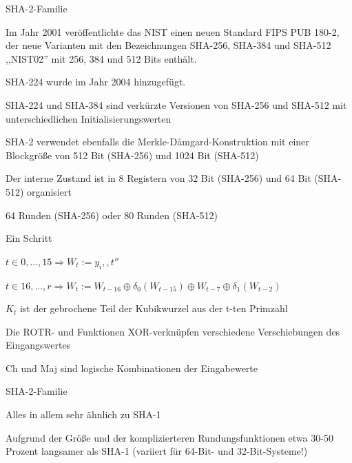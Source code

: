 \documentclass[a4paper]{article}
\begin{document}
\begin{multicols}{3}
\begin{itemize*}
            \item SHA-2-Familie
            \begin{itemize*}
                  \item Im Jahr 2001 veröffentlichte das NIST einen neuen Standard FIPS PUB 180-2, der neue Varianten mit den Bezeichnungen SHA-256, SHA-384 und SHA-512 ,,NIST02'' mit 256, 384 und 512 Bits enthält.
                  \begin{itemize*} \item SHA-224 wurde im Jahr 2004 hinzugefügt. \end{itemize*}
                  \item SHA-224 und SHA-384 sind verkürzte Versionen von SHA-256 und SHA-512 mit unterschiedlichen Initialisierungswerten
                  \item SHA-2 verwendet ebenfalls die Merkle-Dåmgard-Konstruktion mit einer Blockgröße von 512 Bit (SHA-256) und 1024 Bit (SHA-512)
                  \item Der interne Zustand ist in 8 Registern von 32 Bit (SHA-256) und 64 Bit (SHA-512) organisiert
                  \item 64 Runden (SHA-256) oder 80 Runden (SHA-512)
            \end{itemize*}
            \item Ein Schritt
            \begin{itemize*}
                  \item $t\in{0, ..., 15}\Rightarrow W_t:=y_i,,t''$
                  \item $t\in{16, ..., r}\Rightarrow W_t:=W_{t-16}\oplus \delta_0(W_{t-15})\oplus W_{t-7}\oplus\delta_1(W_{t-2})$
                  \item $K_t$ ist der gebrochene Teil der Kubikwurzel aus der t-ten Primzahl
                  \item Die ROTR- und Funktionen XOR-verknüpfen verschiedene Verschiebungen des Eingangswertes
                  \item Ch und Maj sind logische Kombinationen der Eingabewerte
            \end{itemize*}
            \item SHA-2-Familie
            \begin{itemize*}
                  \item Alles in allem sehr ähnlich zu SHA-1
                  \item Aufgrund der Größe und der komplizierteren Rundungsfunktionen etwa 30-50 Prozent langsamer als SHA-1 (variiert für 64-Bit- und 32-Bit-Systeme!)

\end{itemize*}
\end{itemize*}
\end{multicols}
\end{document}
